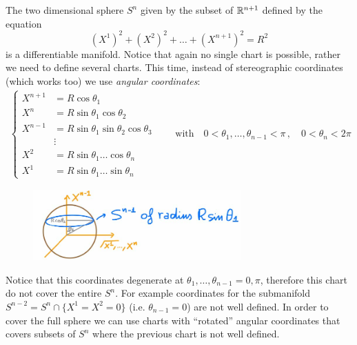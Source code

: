 \documentclass[../main/main.tex]{subfiles}
\begin{document}
\begin{example}[$S^n$]
The two dimensional sphere $S^n$ given by the subset of $\mathbb{R}^{n+1}$ defined by the equation
\[(X^1)^2+(X^2)^2+\dots+(X^{n+1})^2=R^2\]
is a differentiable manifold. Notice that again no single chart is possible, rather we need to define several charts. This time, instead of stereographic coordinates (which works too) we use \emph{angular coordinates}:
\begin{align*}
\begin{cases}
X^{n+1}&=R\cos\theta_1\\
X^n&=R\sin\theta_1\cos\theta_2\\
X^{n-1}&=R\sin\theta_1\sin\theta_2\cos\theta_3\\
&\vdots\\
X^2&=R\sin\theta_1\dots\cos\theta_n\\
X^1&=R\sin\theta_1\dots\sin\theta_n
\end{cases}
\qquad\text{with}\quad0<\theta_1,\dots,\theta_{n-1}<\pi\,,\quad0<\theta_n<2\pi
\end{align*}
\begin{figure}[H]
\centering
\includegraphics[width=8cm]{../img/chart-N-sphere-angular.jpg}
\end{figure}
\noindent Notice that this coordinates degenerate at $\theta_1,\dots,\theta_{n-1}=0,\pi$, therefore this chart do not cover the entire $S^n$. For example coordinates for the submanifold $S^{n-2}=S^n\cap\{X^1=X^2=0\}$ (i.e. $\theta_{n-1}=0$) are not well defined. In order to cover the full sphere we can use charts with ``rotated'' angular coordinates that covers subsets of $S^n$ where the previous chart is not well defined. 

\end{example}
\end{document}
